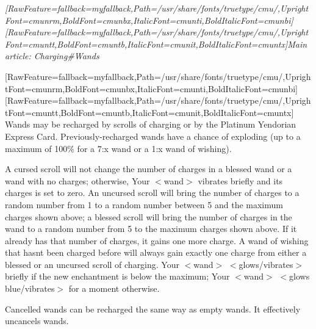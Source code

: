 \begin{myquote}
\item{}{\itshape \allowbreak{}\setmainfont{cmunti.ttf}[RawFeature={fallback=myfallback},Path=/usr/share/fonts/truetype/cmu/,UprightFont=cmunrm,BoldFont=cmunbx,ItalicFont=cmunti,BoldItalicFont=cmunbi]\setmonofont{cmunti.ttf}[RawFeature={fallback=myfallback},Path=/usr/share/fonts/truetype/cmu/,UprightFont=cmuntt,BoldFont=cmuntb,ItalicFont=cmunit,BoldItalicFont=cmuntx]\itshape Main article: Charging\#Wands\footnotemark[130]}
\end{myquote}
\allowbreak{}\setmainfont{cmunrm.ttf}[RawFeature={fallback=myfallback},Path=/usr/share/fonts/truetype/cmu/,UprightFont=cmunrm,BoldFont=cmunbx,ItalicFont=cmunti,BoldItalicFont=cmunbi]\setmonofont{cmunrm.ttf}[RawFeature={fallback=myfallback},Path=/usr/share/fonts/truetype/cmu/,UprightFont=cmuntt,BoldFont=cmuntb,ItalicFont=cmunit,BoldItalicFont=cmuntx]
Wands may be recharged by scrolls of charging\footnotemark[131] or by the Platinum Yendorian Express Card\footnotemark[132]. Previously-{}recharged wands have a chance of exploding (up to a maximum of 100\% for a 7:x wand or a 1:x wand of wishing).


A cursed scroll will not change the number of charges in a blessed wand or a wand with no charges; otherwise, Your {\mbox{$<$}}wand{\mbox{$>$}} vibrates briefly and its charges is set to zero. An uncursed scroll will bring the number of charges to a random number from 1 to a random number between 5 and the maximum charges shown above; a blessed scroll will bring the number of charges in the wand to a random number from 5 to the maximum charges shown above. If it already has that number of charges, it gains one more charge. A wand of wishing that hasn\textquotesingle{}t been charged before will always gain exactly one charge from either a blessed or an uncursed scroll of charging. Your {\mbox{$<$}}wand{\mbox{$>$}} {\mbox{$<$}}glows/vibrates{\mbox{$>$}} briefly if the new enchantment is below the maximum; Your {\mbox{$<$}}wand{\mbox{$>$}} {\mbox{$<$}}glows blue/vibrates{\mbox{$>$}} for a moment otherwise.


Cancelled wands can be recharged the same way as empty wands. It effectively uncancels wands.



